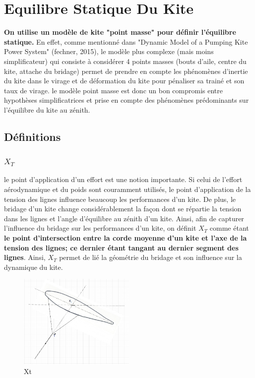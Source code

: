 \chapter{Equilibre Statique Du Kite}
\label{ch:Ch1}

\textbf{On utilise un modèle de kite "point masse" pour définir l'équilibre statique.} En effet, comme mentionné dans "Dynamic Model of a Pumping Kite Power System" (fechner, 2015), le modèle plus complexe (mais moins simplificateur) qui consiste à considérer 4 points masses (bouts d'aile, centre du kite, attache du bridage) permet de prendre en compte les phénomènes d'inertie du kite dans le virage et de déformation du kite pour pénaliser sa trainé et son taux de virage. le modèle point masse est donc un bon compromis entre hypothèses simplificatrices et prise en compte des phénomènes prédominants sur l'équilibre du kite au zénith. 

\section{Définitions}
\label{sec:Ch1.1} 

\subsection{\textbf{$X_{T}$}} 
\label{subsec:Ch1.1.1}

le point d'application d'un effort est une notion importante. Si celui de l'effort aérodynamique et du poids sont couramment utilisés, le point d'application de la tension des lignes influence beaucoup les performances d'un kite. De plus, le bridage d'un kite change considérablement la façon dont se répartie la tension dans les lignes et l'angle d'équilibre au zénith d'un kite. Ainsi, afin de capturer l'influence du bridage sur les performances d'un kite, on définit $X_T$ comme étant \textbf{le point d'intersection entre la corde moyenne d'un kite et l'axe de la tension des lignes; ce dernier étant tangant au dernier segment des lignes}. Ainsi, $X_T$ permet de lié la géométrie du bridage et son influence sur la dynamique du kite.  \\

\begin{figure}[H]
    \centering
    \includegraphics[width=0.5\textwidth]{Pics/01 - xt et towpoint/Xt.png}  
    \caption{Xt}
    \label{fig:Xt}
\end{figure}

